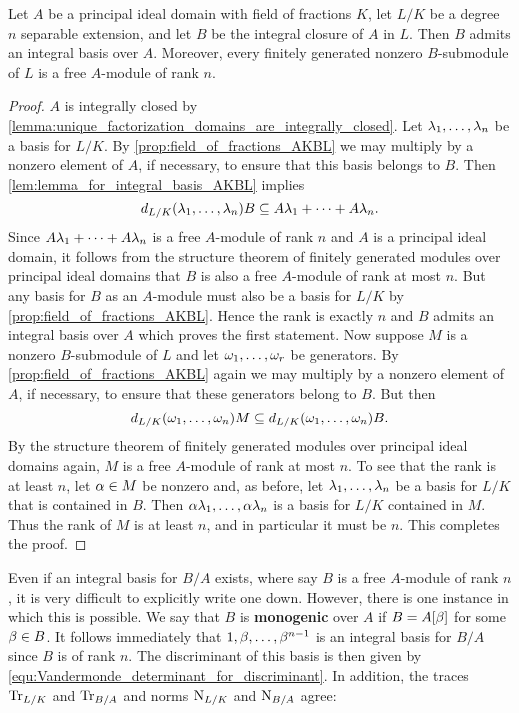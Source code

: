     \begin{theorem}\label{thm:integral_basis_AKBL}
      Let $A$ be a principal ideal domain with field of fractions $K$, let $L/K$ be a degree $n$ separable extension, and let $B$ be the integral closure of $A$ in $L$. Then $B$ admits an integral basis over $A$. Moreover, every finitely generated nonzero $B$-submodule of $L$ is a free $A$-module of rank $n$.
    \end{theorem}
    \begin{proof}
      $A$ is integrally closed by \cref{lemma:unique_factorization_domains_are_integrally_closed}. Let $\lambda_{1},\ldots,\lambda_{n}$ be a basis for $L/K$. By \cref{prop:field_of_fractions_AKBL} we may multiply by a nonzero element of $A$, if necessary, to ensure that this basis belongs to $B$. Then \cref{lem:lemma_for_integral_basis_AKBL} implies
      \[
        d_{L/K}(\lambda_{1},\ldots,\lambda_{n})B \subseteq A\lambda_{1}+\cdots+A\lambda_{n}.
      \]
      Since $A\lambda_{1}+\cdots+A\lambda_{n}$ is a free $A$-module of rank $n$ and $A$ is a principal ideal domain, it follows from the structure theorem of finitely generated modules over principal ideal domains that $B$ is also a free $A$-module of rank at most $n$. But any basis for $B$ as an $A$-module must also be a basis for $L/K$ by \cref{prop:field_of_fractions_AKBL}. Hence the rank is exactly $n$ and $B$ admits an integral basis over $A$ which proves the first statement. Now suppose $M$ is a nonzero $B$-submodule of $L$ and let $\omega_{1},\ldots,\omega_{r}$ be generators. By \cref{prop:field_of_fractions_AKBL} again we may multiply by a nonzero element of $A$, if necessary, to ensure that these generators belong to $B$. But then
      \[
        d_{L/K}(\omega_{1},\ldots,\omega_{n})M \subseteq d_{L/K}(\omega_{1},\ldots,\omega_{n})B.
      \]
      By the structure theorem of finitely generated modules over principal ideal domains again, $M$ is a free $A$-module of rank at most $n$. To see that the rank is at least $n$, let $\alpha \in M$ be nonzero and, as before, let $\lambda_{1},\ldots,\lambda_{n}$ be a basis for $L/K$ that is contained in $B$. Then $\alpha\lambda_{1},\ldots,\alpha\lambda_{n}$ is a basis for $L/K$ contained in $M$. Thus the rank of $M$ is at least $n$, and in particular it must be $n$. This completes the proof.
    \end{proof}

    Even if an integral basis for $B/A$ exists, where say $B$ is a free $A$-module of rank $n$, it is very difficult to explicitly write one down. However, there is one instance in which this is possible. We say that $B$ is \textbf{monogenic} over $A$ if $B = A[\beta]$ for some $\beta \in B$. It follows immediately that $1,\beta,\ldots,\beta^{n-1}$ is an integral basis for $B/A$ since $B$ is of rank $n$. The discriminant of this basis is then given by \cref{equ:Vandermonde_determinant_for_discriminant}. In addition, the traces $\operatorname{\mathrm{Tr}}_{L/K}$ and $\operatorname{\mathrm{Tr}}_{B/A}$ and norms $\operatorname{\mathrm{N}}_{L/K}$ and $\operatorname{\mathrm{N}}_{B/A}$ agree:

